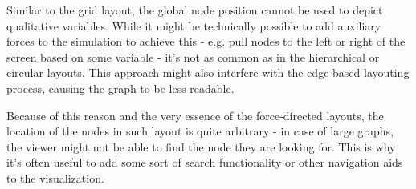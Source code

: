 \begin{itemize}
    Similar to the grid layout, the global node position cannot be used to depict qualitative variables. While it might be technically possible 
    to add auxiliary forces to the simulation to achieve this - e.g. pull nodes to the left or right of the screen based on some variable - 
    it's not as common as in the hierarchical or circular layouts. This approach might also interfere with the edge-based layouting process,
    causing the graph to be less readable.

    Because of this reason and the very essence of the force-directed layouts, the location of the nodes in such layout is quite arbitrary 
    - in case of large graphs, the viewer might not be able to find the node they are looking for. This is why it's often useful to add 
    some sort of search functionality or other navigation aids to the visualization.
\end{itemize}

